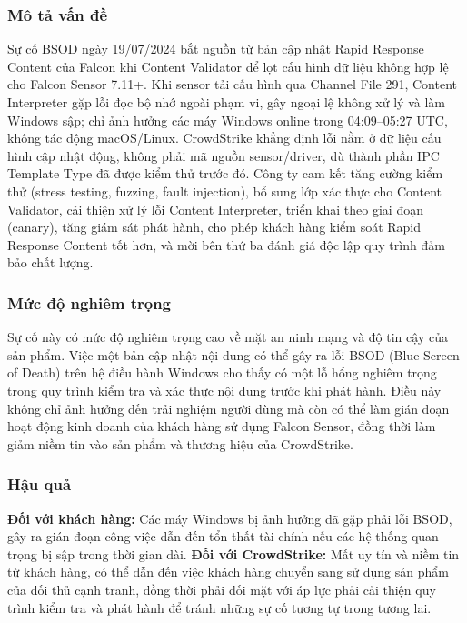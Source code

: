 \subsubsection{Mô tả vấn đề}
Sự cố BSOD ngày 19/07/2024 bắt nguồn từ bản cập nhật Rapid Response Content của Falcon khi Content Validator để lọt cấu hình dữ liệu không hợp lệ cho Falcon Sensor 7.11+. Khi sensor tải cấu hình qua Channel File 291, Content Interpreter gặp lỗi đọc bộ nhớ ngoài phạm vi, gây ngoại lệ không xử lý và làm Windows sập; chỉ ảnh hưởng các máy Windows online trong 04:09--05:27 UTC, không tác động macOS/Linux. CrowdStrike khẳng định lỗi nằm ở dữ liệu cấu hình cập nhật động, không phải mã nguồn sensor/driver, dù thành phần IPC Template Type đã được kiểm thử trước đó. Công ty cam kết tăng cường kiểm thử (stress testing, fuzzing, fault injection), bổ sung lớp xác thực cho Content Validator, cải thiện xử lý lỗi Content Interpreter, triển khai theo giai đoạn (canary), tăng giám sát phát hành, cho phép khách hàng kiểm soát Rapid Response Content tốt hơn, và mời bên thứ ba đánh giá độc lập quy trình đảm bảo chất lượng.

\subsubsection{Mức độ nghiêm trọng}
Sự cố này có mức độ nghiêm trọng cao về mặt an ninh mạng và độ tin cậy của sản phẩm. Việc một bản cập nhật nội dung có thể gây ra lỗi BSOD (Blue Screen of Death) trên hệ điều hành Windows cho thấy có một lỗ hổng nghiêm trọng trong quy trình kiểm tra và xác thực nội dung trước khi phát hành. Điều này không chỉ ảnh hưởng đến trải nghiệm người dùng mà còn có thể làm gián đoạn hoạt động kinh doanh của khách hàng sử dụng Falcon Sensor, đồng thời làm giảm niềm tin vào sản phẩm và thương hiệu của CrowdStrike. 

\subsubsection{Hậu quả}
\textbf{Đối với khách hàng:} Các máy Windows bị ảnh hưởng đã gặp phải lỗi BSOD, gây ra gián đoạn công việc dẫn đến tổn thất tài chính nếu các hệ thống quan trọng bị sập trong thời gian dài.
\textbf{Đối với CrowdStrike:} Mất uy tín và niềm tin từ khách hàng, có thể dẫn đến việc khách hàng chuyển sang sử dụng sản phẩm của đối thủ cạnh tranh, đồng thời phải đối mặt với áp lực phải cải thiện quy trình kiểm tra và phát hành để tránh những sự cố tương tự trong tương lai.

